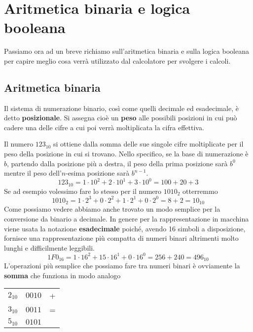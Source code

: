 \chapter{Aritmetica binaria e logica booleana}
Passiamo ora ad un breve richiamo sull'aritmetica binaria e sulla logica booleana per capire meglio
cosa verrà utilizzato dal calcolatore per svolgere i calcoli.

\section{Aritmetica binaria}
Il sistema di numerazione binario, così come quelli decimale ed esadecimale, è detto
\textbf{posizionale}. Si assegna cioè un \textbf{peso} alle possibili posizioni in cui può cadere
una delle cifre a cui poi verrà moltiplicata la cifra effettiva.

Il numero $123_{10}$ si ottiene dalla somma delle sue singole cifre moltiplicate per il peso della
posizione in cui si trovano. Nello specifico, se la base di numerazione è $b$, partendo dalla
posizione più a destra, il peso della prima posizione sarà $b^0$ mentre il peso dell'$n$-esima
posizione sarà $b^{n-1}$.
\[ 123_{10} = 1 \cdot 10^2 + 2 \cdot 10^1 + 3 \cdot 10^0 = 100 + 20 + 3 \]
Se ad esempio volessimo fare lo stesso per il numero $1010_2$ otterremmo
\[ 1010_2 = 1 \cdot 2^3 + 0 \cdot 2^2 + 1 \cdot 2^1 + 0 \cdot 2^0 = 8 + 2 = 10_{10} \]
Come possiamo vedere abbiamo anche trovato un modo semplice per la conversione da binario a
decimale. In genere per la rappresentazione in macchina viene usata la notazione
\textbf{esadecimale} poiché, avendo 16 simboli a disposizione, fornisce una rappresentazione più
compatta di numeri binari altrimenti molto lunghi e difficilmente leggibili.
\[ 1F0_{16} = 1 \cdot 16^2 + 15 \cdot 16^1 + 0 \cdot 16^0 = 256 + 240 = 496_{10} \]
L'operazioni più semplice che possiamo fare tra numeri binari è ovviamente la \textbf{somma} che
funziona in modo analogo
\begin{center}
	\begin{tabular}{c | c c}
		$2_{10}$ & $0010$ & + \\
		$3_{10}$ & $0011$ & = \\ \hline
		$5_{10}$ & $0101$
	\end{tabular}
\end{center}

